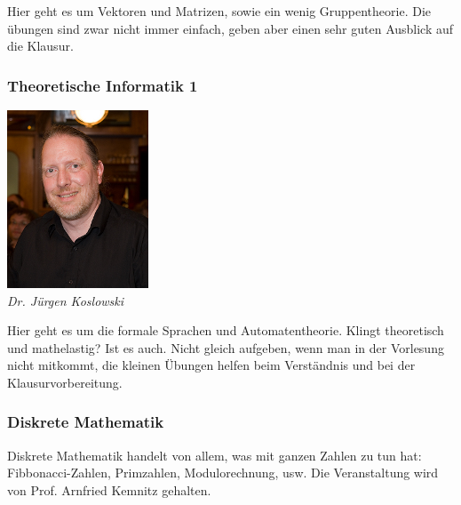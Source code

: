 \begin{multicols}{2}
	Hier geht es um Vektoren und Matrizen, sowie ein wenig Gruppentheorie. Die übungen sind zwar nicht immer einfach, geben aber einen sehr guten Ausblick auf die Klausur.

\subsubsection{Theoretische Informatik 1}
	\includegraphics[width=0.6\linewidth]{bilder/dozenten/koslowski.png}\\
	\textit{Dr. Jürgen Koslowski}

	Hier geht es um die formale Sprachen und Automatentheorie. Klingt theoretisch und mathelastig? Ist es auch. Nicht gleich aufgeben, wenn man in der Vorlesung nicht mitkommt, die kleinen Übungen helfen beim Verständnis und bei der Klausurvorbereitung.

\subsubsection{Diskrete Mathematik}

	Diskrete Mathematik handelt von allem, was mit ganzen Zahlen zu tun hat: Fibbonacci-Zahlen, Primzahlen, Modulorechnung, usw. Die Veranstaltung wird von Prof. Arnfried Kemnitz gehalten.


\end{multicols}
